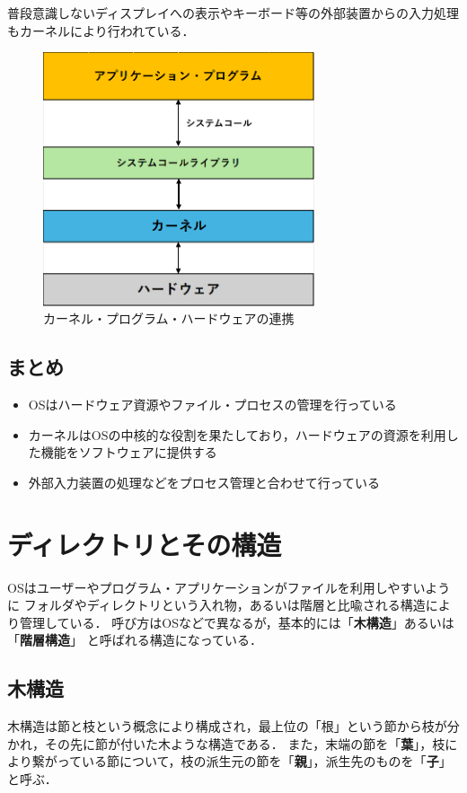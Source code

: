 \documentclass[autodetect-engine,dvi=dvipdfmx,ja=standard,a4j]{bxjsarticle}
\begin{document}
普段意識しないディスプレイへの表示やキーボード等の外部装置からの入力処理もカーネルにより行われている．

\begin{figure}[H]
    \centering
    \includegraphics[width=80mm]{image/kernel-system.png}
    \caption{カーネル・プログラム・ハードウェアの連携}
    \label{fig:kernel}
\end{figure}

\subsection{まとめ}
\begin{itemize}
    \item OSはハードウェア資源やファイル・プロセスの管理を行っている
    \item カーネルはOSの中核的な役割を果たしており，ハードウェアの資源を利用した機能をソフトウェアに提供する
    \item 外部入力装置の処理などをプロセス管理と合わせて行っている
\end{itemize}



\section{ディレクトリとその構造}
OSはユーザーやプログラム・アプリケーションがファイルを利用しやすいように
フォルダやディレクトリという入れ物，あるいは階層と比喩される構造により管理している．
呼び方はOSなどで異なるが，基本的には「\textbf{木構造}」あるいは「\textbf{階層構造}」
と呼ばれる構造になっている．

\subsection{木構造}
木構造は節と枝という概念により構成され，最上位の「根」という節から枝が分かれ，その先に節が付いた木ような構造である．
また，末端の節を「\textbf{葉}」，枝により繋がっている節について，枝の派生元の節を「\textbf{親}」，派生先のものを「\textbf{子}」と呼ぶ．
\end{document}
